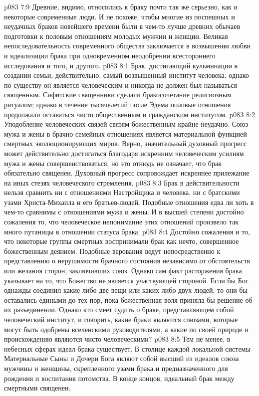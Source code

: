 \vs p083 7:9 \pc Древние, видимо, относились к браку почти так же серьезно, как и некоторые современные люди. И не похоже, чтобы многие из поспешных и неудачных браков новейшего времени были в чем\hyp{}то лучше древних обычаев подготовки к половым отношениям молодых мужчин и женщин. Великая непоследовательность современного общества заключается в возвышении любви и идеализации брака при одновременном неодобрении всестороннего исследования и того, и другого.
\vs p083 8:1 Брак, достигающий кульминации в создании семьи, действительно, самый возвышенный институт человека, однако по существу он является человеческим и никогда не должен был называться священным. Сифитские священники сделали бракосочетание религиозным ритуалом; однако в течение тысячелетий после Эдема половые отношения продолжали оставаться чисто общественным и гражданским институтом.
\vs p083 8:2 Уподобление человеческих связей связям божественным крайне неудачно. Союз мужа и жены в брачно\hyp{}семейных отношениях является материальной функцией смертных эволюционирующих миров. Верно, значительный духовный прогресс может действительно достигаться благодаря искренним человеческим усилиям мужа и жены совершенствоваться, но это отнюдь не означает, что брак обязательно священен. Духовный прогресс сопровождает искреннее прилежание на иных стезях человеческого стремления.
\vs p083 8:3 Брак в действительности нельзя сравнить ни с отношениями Настройщика и человека, ни с братскими узами Христа\hyp{}Михаила и его братьев\hyp{}людей. Подобные отношения едва ли хоть в чем\hyp{}то сравнимы с отношениями мужа и жены. И в высшей степени достойно сожаления то, что человеческое непонимание этих отношений произвело так много путаницы в отношении статуса брака.
\vs p083 8:4 Достойно сожаления и то, что некоторые группы смертных воспринимали брак как нечто, совершенное божественным деянием. Подобные верования ведут непосредственно к представлению о нерушимости брачного состояния независимо от обстоятельств или желания сторон, заключивших союз. Однако сам факт расторжения брака указывает на то, что Божество не является участвующей стороной. Если бы Бог однажды соединил какие\hyp{}либо две вещи или каких\hyp{}либо двух людей, то они бы оставались едиными до тех пор, пока божественная воля приняла бы решение об их разъединении. Однако кто смеет судить о браке, представляющем собой человеческий институт, и говорить, какие браки являются союзами, которые могут быть одобрены вселенскими руководителями, а какие по своей природе и происхождению являются чисто человеческими?
\vs p083 8:5 Тем не менее, в небесных сферах идеал брака существует. В столице каждой локальной системы Материальные Сыны и Дочери Бога являют собой высший из идеалов союза мужчины и женщины, скрепленного узами брака и предназначенного для рождения и воспитания потомства. В конце концов, идеальный брак между смертными  священен.
